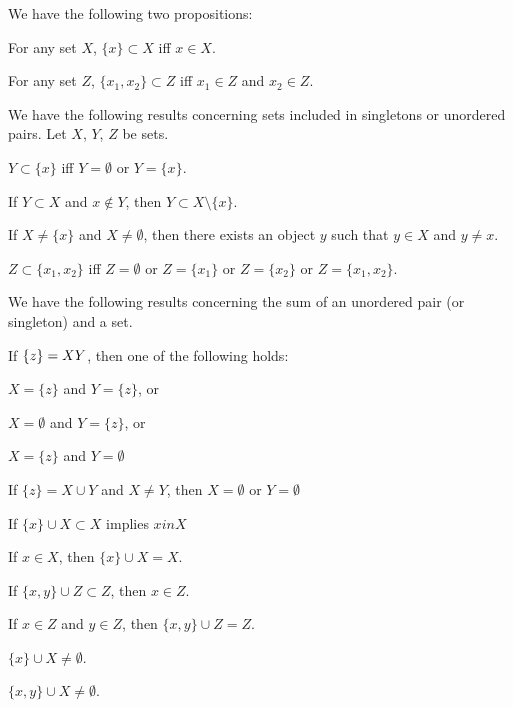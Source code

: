 \documentclass{article}
\begin{document}
\medbreak
We have the following two propositions:
\begin{thm}
\item\label{zfmisc1:31} For any set $X$, $\{x\}\subset X$ iff $x\in X$.
\item\label{zfmisc1:32} For any set $Z$, $\{x_{1},x_{2}\}\subset Z$
  iff $x_{1}\in Z$ and $x_{2}\in Z$.
\end{thm}

\medbreak
We have the following results concerning sets included in singletons or
unordered pairs. Let $X$, $Y$, $Z$ be sets.
\begin{thm}
\item\label{zfmisc1:33} $Y\subset\{x\}$ iff $Y=\emptyset$ or $Y=\{x\}$.
\item\label{zfmisc1:34} If $Y\subset X$ and $x\notin Y$, then $Y\subset X\setminus\{x\}$.
\item\label{zfmisc1:35} If $X\neq\{x\}$ and $X\neq\emptyset$, then there
  exists an object $y$ such that $y\in X$ and $y\neq x$.
\item\label{zfmisc1:36} $Z\subset\{x_{1},x_{2}\}$ iff $Z=\emptyset$ or
  $Z=\{x_{1}\}$ or $Z=\{x_{2}\}$ or $Z=\{x_{1},x_{2}\}$.
\end{thm}


\medbreak
We have the following results concerning the sum of an unordered pair
(or singleton) and a set.
\begin{thm}
\item\label{zfmisc1:37} If $\{z\}=X \/ Y$, then one of the following holds:
  \begin{enumerate*}[label=(\roman*)]
  \item $X = \{z\}$ and $Y = \{z\}$, or
  \item $X = \emptyset$ and $Y = \{z\}$, or
  \item $X = \{z\}$ and $Y = \emptyset$
  \end{enumerate*}
\item\label{zfmisc1:38} If $\{z\} = X \cup Y$ and $X \neq Y$, then $X = \emptyset$ or
  $Y = \emptyset$
\item\label{zfmisc1:39} If $\{x\} \cup X\subset X$ implies $x in X$
\item\label{zfmisc1:40} If $x\in X$, then $\{x\}\cup X=X$.
\item\label{zfmisc1:41} If $\{x,y\}\cup Z\subset Z$, then $x\in Z$.
\item\label{zfmisc1:42} If $x\in Z$ and $y\in Z$, then $\{x,y\}\cup Z=Z$.
\item\label{zfmisc1:43} $\{x\}\cup X\neq\emptyset$.
\item\label{zfmisc1:44} $\{x,y\}\cup X\neq\emptyset$.
\end{thm}
\end{document}
